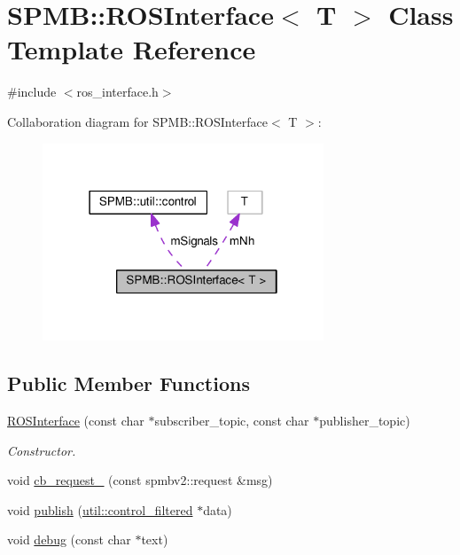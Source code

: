 \hypertarget{classSPMB_1_1ROSInterface}{}\section{S\+P\+MB\+:\+:R\+O\+S\+Interface$<$ T $>$ Class Template Reference}
\label{classSPMB_1_1ROSInterface}


{\ttfamily \#include $<$ros\+\_\+interface.\+h$>$}



Collaboration diagram for S\+P\+MB\+:\+:R\+O\+S\+Interface$<$ T $>$\+:
\nopagebreak
\begin{figure}[H]
\begin{center}
\leavevmode
\includegraphics[width=238pt]{classSPMB_1_1ROSInterface__coll__graph}
\end{center}
\end{figure}
\subsection*{Public Member Functions}
\begin{DoxyCompactItemize}
\item 
\hyperlink{classSPMB_1_1ROSInterface_a35478a3b15d22289c6820e70e5cec671}{R\+O\+S\+Interface} (const char $\ast$subscriber\+\_\+topic, const char $\ast$publisher\+\_\+topic)\hypertarget{classSPMB_1_1ROSInterface_a35478a3b15d22289c6820e70e5cec671}{}\label{classSPMB_1_1ROSInterface_a35478a3b15d22289c6820e70e5cec671}

\begin{DoxyCompactList}\small\item\em Constructor. \end{DoxyCompactList}\item 
void \hyperlink{classSPMB_1_1ROSInterface_a24592b40d99ca3ed071b8ef9ab918f4d}{cb\+\_\+request\+\_\+} (const spmbv2\+::request \&msg)
\item 
void \hyperlink{classSPMB_1_1ROSInterface_abb8a72d72e30a8475793200c730e26e6}{publish} (\hyperlink{structSPMB_1_1util_1_1control__filtered}{util\+::control\+\_\+filtered} $\ast$data)
\item 
void \hyperlink{classSPMB_1_1ROSInterface_a6e220ac2a41d61b6185190cc372b1e42}{debug} (const char $\ast$text)
\end{DoxyCompactItemize}
